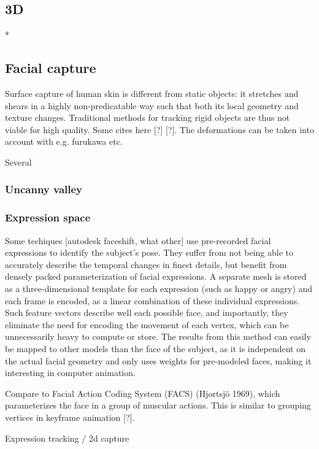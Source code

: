 \subsection{3D}

*

\subsection{Facial capture}

Surface capture of human skin is different from static objects: it stretches and shears in a highly non-predicatable way such that both its local geometry and texture changes.
Traditional methods for tracking rigid objects are thus not viable for high quality.
Some cites here [?] [?]. The deformations can be taken into account with e.g. furukawa etc.

Several 

\subsubsection{Uncanny valley}

\subsubsection{Expression space}

Some techiques [autodesk faceshift, what other] use pre-recorded facial expressions to identify the subject's pose. They suffer from not being able to accurately describe the temporal changes in finest details, but benefit from densely packed parameterization of facial expressions.
A separate mesh is stored as a three-dimensional template for each expression (such as happy or angry) and each frame is encoded, as a linear combination of these individual expressions.
Such feature vectors describe well each possible face, and importantly, they eliminate the need for encoding the movement of each vertex, which can be unnecessarily heavy to compute or store.
The results from this method can easily be mapped to other models than the face of the subject, as it is independent on the actual facial geometry and only uses weights for pre-modeled faces, making it interesting in computer animation.

Compare to Facial Action Coding System (FACS) (Hjortsjö 1969), which parameterizes the face in a group of muscular actions. This is similar to grouping vertices in keyframe animation [?].

Expression tracking / 2d capture


